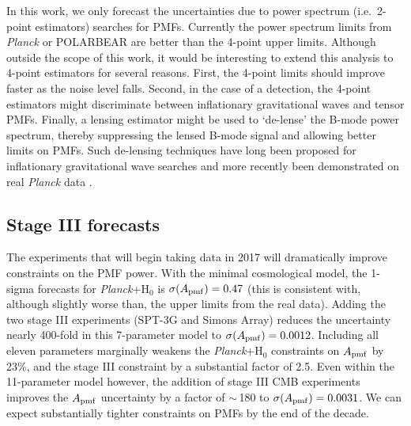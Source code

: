 \documentclass[apj]{emulateapj}
\newcommand{\apmf}{\ensuremath{A_{\rm pmf}}}
\newcommand{\lcdm}{\ensuremath{\Lambda}CDM}
\newcommand{\ho}{H\ensuremath{_0}}
\newcommand{\planck}{{\sl Planck}}
\newcommand{\sptnew}{SPT-3G}
\newcommand{\pb}{POLARBEAR}
\newcommand{\simons}{Simons Array}
\newcommand{\tbd}[1]{\textcolor{Red}{{\bf TBD}: #1}}
\begin{document}
In this work, we only forecast the uncertainties due to power spectrum (i.e.~2-point estimators) searches for PMFs. 
Currently the power spectrum limits from \planck{} or \pb{} are better than the 4-point upper limits. 
Although outside the scope of this work, it would be interesting to extend this analysis to 4-point estimators for several reasons. 
First, the 4-point limits should improve faster as the noise level falls. 
Second, in the case of a detection, the 4-point estimators might discriminate between inflationary gravitational waves and tensor PMFs. 
Finally, a lensing estimator might be used to `de-lense' the B-mode power spectrum, thereby suppressing the lensed B-mode signal and allowing better limits on PMFs. 
Such de-lensing techniques have long been proposed for inflationary gravitational wave searches \citep[e.g.][]{knox02,kesden02,seljak04a,simard15} and more recently been demonstrated on real \planck{} data \citep{larsen16}. 


\subsection{Stage III forecasts}

The experiments that will begin taking data in 2017 will dramatically improve constraints on the PMF power. 
With the minimal cosmological model, the 1-sigma forecasts for \planck{}+\ho{} is $\sigma(\apmf)=0.47$ (this is consistent with, although slightly worse than, the upper limits from the real data).  
Adding the two stage III experiments (\sptnew{} and \simons{}) reduces the uncertainty nearly 400-fold in this 7-parameter model to $\sigma(\apmf)=0.0012$. 
Including all eleven parameters marginally weakens the \planck+\ho{} constraints on \apmf{} by 23\%, and the stage III constraint by a substantial factor of 2.5. 
Even within the 11-parameter model however,  the addition of stage III CMB experiments improves the \apmf{} uncertainty by a factor of $\sim$\,180 to  $\sigma(\apmf)=0.0031$. 
We can expect substantially tighter constraints on PMFs by the end of the decade. 
\end{document}
